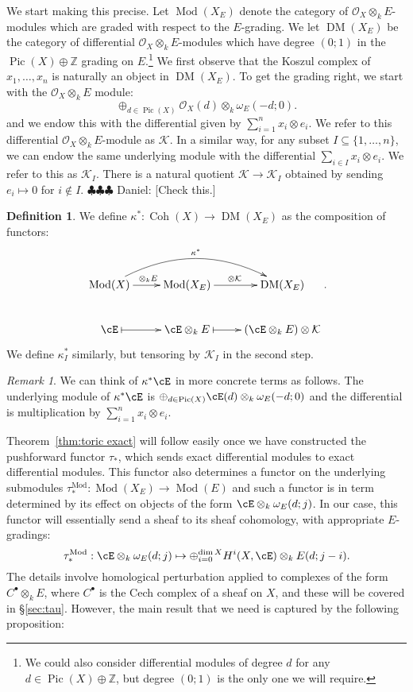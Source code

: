 \documentclass[12pt]{amsart}
\theoremstyle{definition}
\newtheorem{defn}[lemma]{Definition}
\theoremstyle{remark}
\newtheorem{remark}[lemma]{Remark}
\newcommand{\Kos}{\mathcal{K}}
\newcommand{\ZZ}{\mathbb Z}
\newcommand{\Pic}{\operatorname{Pic}}
\newcommand{\cO}{{\mathcal O}}
\newcommand{\daniel}[1]{{\color{blue} \sf $\clubsuit\clubsuit\clubsuit$ Daniel: [#1]}}
\def\DM{\operatorname{DM}}
\def\Coh{\operatorname{Coh}}
\def\Mod{\operatorname{Mod}}
\begin{document}
\medskip 
We start making this precise.  Let $\Mod(X_E)$ denote the category of $\cO_X\otimes_k E$-modules which are graded with respect to the $E$-grading.  We let $\DM(X_E)$ be the category of differential $\cO_X\otimes_k E$-modules which have degree $(0;1)$ in the $\Pic(X)\oplus \ZZ$ grading on $E$.\footnote{We could also consider differential modules of degree $d$ for any $d\in \Pic(X)\oplus \ZZ$, but degree $(0;1)$ is the only one we will require.} We first observe that the Koszul complex of $x_1, \dots, x_n$ is naturally an object in $\DM(X_E)$.  To get the grading right, we start with the $\cO_X\otimes_k E$ module:
\[
\oplus_{d\in \Pic(X)} \cO_X(d) \otimes_k \omega_E(-d;0).
\]
and we endow this with the differential given by $\sum_{i=1}^n x_i\otimes e_i$.  We refer to this differential $\cO_{X}\otimes_k E$-module as $\Kos$.  In a similar way, for any subset $I\subseteq \{1,\dots,n\}$, we can endow the same underlying module with the differential $\sum_{i\in I} x_i\otimes e_i$.  We refer to this as $\Kos_I$.  There is a natural quotient
$
\Kos\to \Kos_I
$
obtained by sending $e_i\mapsto 0$ for $i\notin I$.  \daniel{Check this.}

\begin{defn}
We define $\kappa^*: \Coh(X) \to \DM(X_E)$ as the composition of functors:
\[
\xymatrix{
\Mod(X) \ar@/^2pc/[rr]^{\kappa^*}\ar[r]^{\otimes_k E}&\Mod(X_E)\ar[r]^{\otimes \Kos}&\DM(X_E)\\
\cE\ar@{|->}[r]&\cE\otimes_k E \ar@{|->}[r]&(\cE\otimes_k E)\otimes \Kos
}.
\]
We define $\kappa_I^*$ similarly, but tensoring by $\Kos_I$ in the second step.
\end{defn}
\begin{remark}
We can think of $\kappa^*\cE$ in more concrete terms as follows.  The underlying module of $\kappa^*\cE$ is $\oplus_{d\in \Pic(X)} \cE(d)\otimes_k \omega_E(-d;0)$ and the differential is multiplication by $\sum_{i=1}^n x_i\otimes e_i$.
\end{remark}


Theorem~\ref{thm:toric exact} will follow easily once we have constructed the pushforward functor $\tau_*$, which sends exact differential modules to exact differential modules.  This functor also determines a functor on the underlying submodules $\tau^{\Mod}_*: \Mod(X_E)\to \Mod(E)$ and such a functor is in term determined by its effect on objects of the form $\cE\otimes_k \omega_E(d;j)$. 
In our case, this functor will essentially send a sheaf to its sheaf cohomology, with appropriate $E$-gradings:
\[
\tau^{\Mod}_*: \cE\otimes_k \omega_E(d;j) \mapsto \oplus_{i=0}^{\dim X}H^i(X,\cE) \otimes_k E(d; j-i).
\]
The details involve homological perturbation applied to complexes of the form $C^\bullet\otimes_k E$, where $C^\bullet$ is the Cech complex of a sheaf on $X$, and these will be covered in \S\ref{sec:tau}.  However, the main result that we need is captured by the following proposition:
\end{document}
